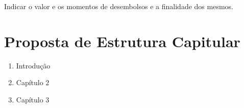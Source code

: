 Indicar o valor e os momentos de desembolsos e a finalidade dos mesmos.


\chapter{Proposta de Estrutura Capitular}

\begin{enumerate}
    \item Introdução
    \item Capítulo 2
    \item Capítulo 3
\end{enumerate}


\postextual




\printindex


